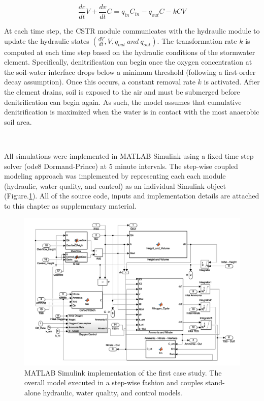\begin{equation} \label{cstr}
  \frac{dc}{dt}  V + \frac{dv}{dt}  C = q_{in}  C_{in} - q_{out}  C - k  C  V
\end{equation}

At each time step, the CSTR module communicates with the hydraulic module to update the hydraulic states $( \frac{dV}{dt}, V , q_{out} \ and \ q_{out})$. The transformation rate $k$ is computed at each time step based on the hydraulic conditions of the stormwater element. Specifically, denitrification can  begin once the oxygen concentration at the soil-water interface drops below a minimum threshold (following a first-order decay assumption). Once this occurs, a constant removal rate $k$ is activated. After the element drains, soil is exposed to the air and must be submerged before denitrification can begin again. As such, the model assumes that cumulative denitrification is maximized when the water is in contact with the most anaerobic soil area. 

\

All simulations were implemented in MATLAB Simulink\cite{TheMathWorksInc.MATLAB} using a fixed time step solver (ode8 Dormand-Prince\cite{Dormand1980AFormulae}) at 5 minute intervals. 
The step-wise coupled modeling approach was implemented by representing each  each module (hydraulic, water quality, and control) as an individual Simulink object (Figure.\ref{fig-ch1:simulink}). All of the source code, inputs and implementation details are attached to this chapter as supplementary material.

\begin{figure}
\includegraphics[width=\linewidth]{gfx/Chapter-1/Model_Individual.png}
\caption{MATLAB Simulink implementation of the first case study. The overall model executed in a step-wise fashion and couples stand-alone hydraulic, water quality, and control models.}\label{fig-ch1:simulink}
\end{figure}

